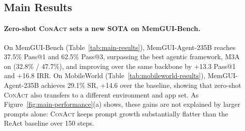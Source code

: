 \documentclass{llmxive}
\providecommand{\llmname}[1]{{\fontfamily{pcr}\selectfont{#1}}}
\providecommand{\ourmethod}{MemGUI-Agent\xspace}
\providecommand{\conact}{\textsc{ConAct}\xspace}
\begin{document}
\subsection{Main Results}
\label{sec:main-results}
\vspace{-0.25em}

\paragraph{Zero-shot \conact sets a new SOTA on MemGUI-Bench.}
On MemGUI-Bench (Table~\ref{tab:main-results}), \ourmethod-235B reaches 37.5\% Pass@1 and 62.5\% Pass@3, surpassing the best agentic framework, M3A on \llmname{Gemini-2.5-Pro} (32.8\% / 47.7\%), and improving over the same backbone by $+$13.3 Pass@1 and $+$16.8 IRR. On MobileWorld (Table~\ref{tab:mobileworld-results}), \ourmethod-235B achieves 29.1\% SR, $+$14.6 over the \llmname{Qwen3-VL-235B-Thinking} baseline, showing that zero-shot \conact also transfers to a different environment and app set. As Figure~\ref{fig:main-performance}(a) shows, these gains are not explained by larger prompts alone: \conact keeps prompt growth substantially flatter than the ReAct baseline over 150 steps.
\end{document}
